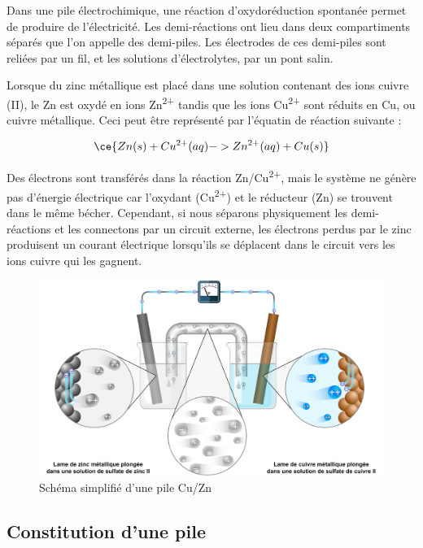 \documentclass[
  11pt,
  french,
  a4paper,
  openany]{book}
\begin{document}
Dans une pile électrochimique, une réaction d'oxydoréduction spontanée permet de produire de l'électricité. Les demi-réactions ont lieu dans deux compartiments séparés que l'on appelle des demi-piles. Les électrodes de ces demi-piles sont reliées par un fil, et les solutions d'électrolytes, par un pont salin.

Lorsque du zinc métallique est placé dans une solution contenant des ions cuivre (II), le Zn est oxydé en ions Zn\textsuperscript{2+} tandis que les ions Cu\textsuperscript{2+} sont réduits en Cu, ou cuivre métallique. Ceci peut être représenté par l'équatin de réaction suivante :

\[
\ce{Zn(s) + Cu^{2+}(aq) -> Zn^{2+}(aq) + Cu(s)}
\]

Des électrons sont transférés dans la réaction Zn/Cu\textsuperscript{2+}, mais le système ne génère pas d'énergie électrique car l'oxydant (Cu\textsuperscript{2+}) et le réducteur (Zn) se trouvent dans le même bécher. Cependant, si nous séparons physiquement les demi-réactions et les connectons par un circuit externe, les électrons perdus par le zinc produisent un courant électrique lorsqu'ils se déplacent dans le circuit vers les ions cuivre qui les gagnent.

\begin{figure}

{\centering \includegraphics[width=0.9\linewidth]{images/pile-electrique-v2} 

}

\caption{Schéma simplifié d'une pile Cu/Zn}\label{fig:pile-electrique-v2}
\end{figure}

\hypertarget{constitution-dune-pile}{%
\subsection{Constitution d'une pile}\label{constitution-dune-pile}}
\end{document}
